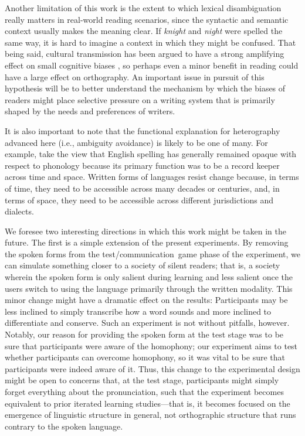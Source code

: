 \documentclass[doc,biblatex]{apa7}
\begin{document}
Another limitation of this work is the extent to which lexical disambiguation really matters in real-world reading scenarios, since the syntactic and semantic context usually makes the meaning clear. If \textit{knight} and \textit{night} were spelled the same way, it is hard to imagine a context in which they might be confused. That being said, cultural transmission has been argued to have a strong amplifying effect on small cognitive biases \parencite{Thompson:2016}, so perhaps even a minor benefit in reading could have a large effect on orthography. An important issue in pursuit of this hypothesis will be to better understand the mechanism by which the biases of readers might place selective pressure on a writing system that is primarily shaped by the needs and preferences of writers.

It is also important to note that the functional explanation for heterography advanced here (i.e., ambiguity avoidance) is likely to be one of many. For example, \textcite{Stenroos:2016} take the view that English spelling has generally remained opaque with respect to phonology because its primary function was to be a record keeper across time and space. Written forms of languages resist change because, in terms of time, they need to be accessible across many decades or centuries, and, in terms of space, they need to be accessible across different jurisdictions and dialects.

We foresee two interesting directions in which this work might be taken in the future. The first is a simple extension of the present experiments. By removing the spoken forms from the test/communication~game phase of the experiment, we can simulate something closer to a society of silent readers; that is, a society wherein the spoken form is only salient during learning and less salient once the users switch to using the language primarily through the written modality. This minor change might have a dramatic effect on the results: Participants may be less inclined to simply transcribe how a word sounds and more inclined to differentiate and conserve. Such an experiment is not without pitfalls, however. Notably, our reason for providing the spoken form at the test stage was to be sure that participants were aware of the homophony; our experiment aims to test whether participants can overcome homophony, so it was vital to be sure that participants were indeed aware of it. Thus, this change to the experimental design might be open to concerns that, at the test stage, participants might simply forget everything about the pronunciation, such that the experiment becomes equivalent to prior iterated learning studies---that is, it becomes focused on the emergence of linguistic structure in general, not orthographic structure that runs contrary to the spoken language. 
\end{document}
